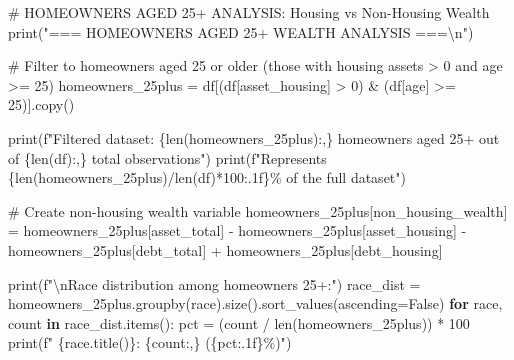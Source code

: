 \documentclass[
  letterpaper,
  DIV=11,
  numbers=noendperiod]{scrartcl}
\newenvironment{Shaded}{\begin{snugshade}}{\end{snugshade}}
\newcommand{\BuiltInTok}[1]{\textcolor[rgb]{0.00,0.23,0.31}{#1}}
\newcommand{\CharTok}[1]{\textcolor[rgb]{0.13,0.47,0.30}{#1}}
\newcommand{\CommentTok}[1]{\textcolor[rgb]{0.37,0.37,0.37}{#1}}
\newcommand{\ControlFlowTok}[1]{\textcolor[rgb]{0.00,0.23,0.31}{\textbf{#1}}}
\newcommand{\DecValTok}[1]{\textcolor[rgb]{0.68,0.00,0.00}{#1}}
\newcommand{\KeywordTok}[1]{\textcolor[rgb]{0.00,0.23,0.31}{\textbf{#1}}}
\newcommand{\NormalTok}[1]{\textcolor[rgb]{0.00,0.23,0.31}{#1}}
\newcommand{\OperatorTok}[1]{\textcolor[rgb]{0.37,0.37,0.37}{#1}}
\newcommand{\SpecialCharTok}[1]{\textcolor[rgb]{0.37,0.37,0.37}{#1}}
\newcommand{\SpecialStringTok}[1]{\textcolor[rgb]{0.13,0.47,0.30}{#1}}
\newcommand{\StringTok}[1]{\textcolor[rgb]{0.13,0.47,0.30}{#1}}
\newcommand{\VariableTok}[1]{\textcolor[rgb]{0.07,0.07,0.07}{#1}}
\begin{document}
\begin{Shaded}
\begin{Highlighting}[]
\CommentTok{\# HOMEOWNERS AGED 25+ ANALYSIS: Housing vs Non{-}Housing Wealth}
\BuiltInTok{print}\NormalTok{(}\StringTok{"=== HOMEOWNERS AGED 25+ WEALTH ANALYSIS ===}\CharTok{\textbackslash{}n}\StringTok{"}\NormalTok{)}

\CommentTok{\# Filter to homeowners aged 25 or older (those with housing assets \textgreater{} 0 and age \textgreater{}= 25)}
\NormalTok{homeowners\_25plus }\OperatorTok{=}\NormalTok{ df[(df[}\StringTok{\textquotesingle{}asset\_housing\textquotesingle{}}\NormalTok{] }\OperatorTok{\textgreater{}} \DecValTok{0}\NormalTok{) }\OperatorTok{\&}\NormalTok{ (df[}\StringTok{\textquotesingle{}age\textquotesingle{}}\NormalTok{] }\OperatorTok{\textgreater{}=} \DecValTok{25}\NormalTok{)].copy()}

\BuiltInTok{print}\NormalTok{(}\SpecialStringTok{f"Filtered dataset: }\SpecialCharTok{\{}\BuiltInTok{len}\NormalTok{(homeowners\_25plus)}\SpecialCharTok{:,\}}\SpecialStringTok{ homeowners aged 25+ out of }\SpecialCharTok{\{}\BuiltInTok{len}\NormalTok{(df)}\SpecialCharTok{:,\}}\SpecialStringTok{ total observations"}\NormalTok{)}
\BuiltInTok{print}\NormalTok{(}\SpecialStringTok{f"Represents }\SpecialCharTok{\{}\BuiltInTok{len}\NormalTok{(homeowners\_25plus)}\OperatorTok{/}\BuiltInTok{len}\NormalTok{(df)}\OperatorTok{*}\DecValTok{100}\SpecialCharTok{:.1f\}}\SpecialStringTok{\% of the full dataset"}\NormalTok{)}

\CommentTok{\# Create non{-}housing wealth variable}
\NormalTok{homeowners\_25plus[}\StringTok{\textquotesingle{}non\_housing\_wealth\textquotesingle{}}\NormalTok{] }\OperatorTok{=}\NormalTok{ homeowners\_25plus[}\StringTok{\textquotesingle{}asset\_total\textquotesingle{}}\NormalTok{] }\OperatorTok{{-}}\NormalTok{ homeowners\_25plus[}\StringTok{\textquotesingle{}asset\_housing\textquotesingle{}}\NormalTok{] }\OperatorTok{{-}}\NormalTok{ homeowners\_25plus[}\StringTok{\textquotesingle{}debt\_total\textquotesingle{}}\NormalTok{] }\OperatorTok{+}\NormalTok{ homeowners\_25plus[}\StringTok{\textquotesingle{}debt\_housing\textquotesingle{}}\NormalTok{]}

\BuiltInTok{print}\NormalTok{(}\SpecialStringTok{f"}\CharTok{\textbackslash{}n}\SpecialStringTok{Race distribution among homeowners 25+:"}\NormalTok{)}
\NormalTok{race\_dist }\OperatorTok{=}\NormalTok{ homeowners\_25plus.groupby(}\StringTok{\textquotesingle{}race\textquotesingle{}}\NormalTok{).size().sort\_values(ascending}\OperatorTok{=}\VariableTok{False}\NormalTok{)}
\ControlFlowTok{for}\NormalTok{ race, count }\KeywordTok{in}\NormalTok{ race\_dist.items():}
\NormalTok{    pct }\OperatorTok{=}\NormalTok{ (count }\OperatorTok{/} \BuiltInTok{len}\NormalTok{(homeowners\_25plus)) }\OperatorTok{*} \DecValTok{100}
    \BuiltInTok{print}\NormalTok{(}\SpecialStringTok{f"  }\SpecialCharTok{\{}\NormalTok{race}\SpecialCharTok{.}\NormalTok{title()}\SpecialCharTok{\}}\SpecialStringTok{: }\SpecialCharTok{\{}\NormalTok{count}\SpecialCharTok{:,\}}\SpecialStringTok{ (}\SpecialCharTok{\{}\NormalTok{pct}\SpecialCharTok{:.1f\}}\SpecialStringTok{\%)"}\NormalTok{)}


\end{Highlighting}
\end{Shaded}
\end{document}
